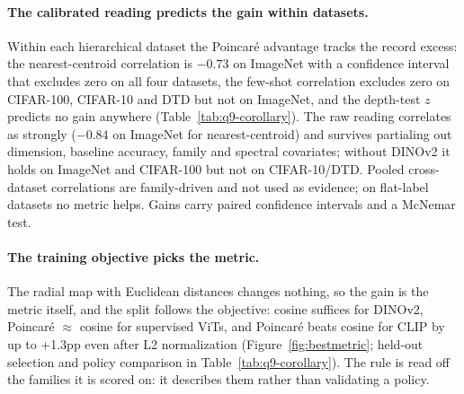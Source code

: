 \documentclass{article}
\begin{document}
\paragraph{The calibrated reading predicts the gain within datasets.} Within each hierarchical dataset the Poincar\'{e} advantage tracks the record excess: the nearest-centroid correlation is $-0.73$ on ImageNet with a confidence interval that excludes zero on all four datasets, the few-shot correlation excludes zero on CIFAR-100, CIFAR-10 and DTD but not on ImageNet, and the depth-test $z$ predicts no gain anywhere (Table~\ref{tab:q9-corollary}). The raw reading correlates as strongly ($-0.84$ on ImageNet for nearest-centroid) and survives partialing out dimension, baseline accuracy, family and spectral covariates; without DINOv2 it holds on ImageNet and CIFAR-100 but not on CIFAR-10/DTD. Pooled cross-dataset correlations are family-driven and not used as evidence; on flat-label datasets no metric helps. Gains carry paired confidence intervals and a McNemar test. %

\paragraph{The training objective picks the metric.} The radial map with Euclidean distances changes nothing, so the gain is the metric itself, and the split follows the objective: cosine suffices for DINOv2, Poincar\'{e} $\approx$ cosine for supervised ViTs, and Poincar\'{e} beats cosine for CLIP by up to +1.3pp even after L2 normalization (Figure~\ref{fig:bestmetric}; held-out selection and policy comparison in Table~\ref{tab:q9-corollary}). The rule is read off the families it is scored on: it describes them rather than validating a policy. %
\end{document}
